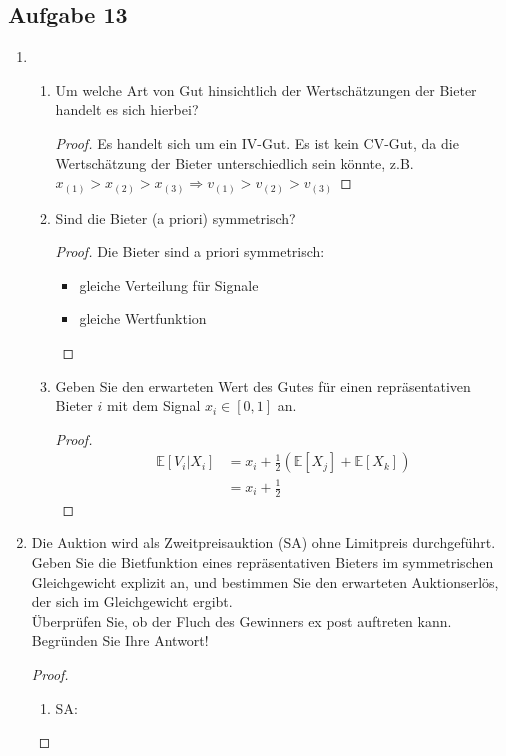 \documentclass[12pt]{extreport} %
\theoremstyle{named}
\theoremstyle{itshape}
\theoremstyle{normal}
\begin{document}
\subsection*{Aufgabe 13}
\begin{enumerate}
	\item \begin{enumerate}
	  \item Um welche Art von Gut hinsichtlich der Wertschätzungen der Bieter handelt es sich hierbei?
		\begin{proof}
			Es handelt sich um ein IV-Gut. Es ist kein CV-Gut, da die Wertschätzung der Bieter unterschiedlich sein könnte, z.B. $x_{(1)} > x_{(2)} > x_{(3)} \Rightarrow v_{(1)} > v_{(2)} > v_{(3)}$
		\end{proof}
	  \item Sind die Bieter (a priori) symmetrisch?
		\begin{proof}
			Die Bieter sind a priori symmetrisch:
			\begin{itemize}
				\item gleiche Verteilung für Signale
				\item gleiche Wertfunktion
			\end{itemize}
		\end{proof}
	  \item Geben Sie den erwarteten Wert des Gutes für einen repräsentativen Bieter $i$ mit dem Signal $x_{i} \in [0, 1]$ an.
		\begin{proof}
			\begin{align*}
				\mathds{E} \left[ V_{i} \big| X_{i} \right] & = x_{i} + \frac{1}{2} \left( \mathds{E} \left[ X_{j} \right] + \mathds{E} \left[ X_{k} \right] \right) \\
			& = x_{i} + \frac{1}{2}
			\end{align*}
		\end{proof}
	 \end{enumerate}
	\item Die Auktion wird als Zweitpreisauktion (SA) ohne Limitpreis durchgeführt. ~\\
		Geben Sie die Bietfunktion eines repräsentativen Bieters im symmetrischen Gleichgewicht explizit an, und bestimmen Sie den erwarteten Auktionserlös, der sich im Gleichgewicht ergibt. ~\\
		Überprüfen Sie, ob der Fluch des Gewinners ex post auftreten kann. Begründen Sie Ihre Antwort!
		\begin{proof}
			\begin{enumerate}
				\item SA: 

\end{enumerate}
\end{proof}
\end{enumerate}
\end{document}
